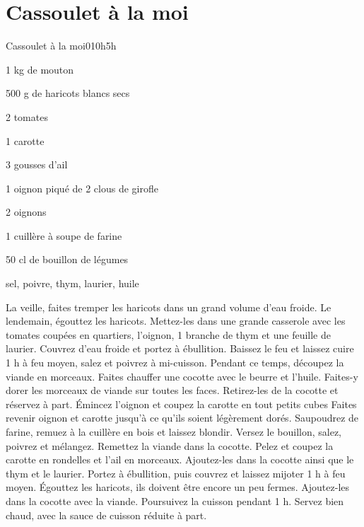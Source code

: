 {\section{Cassoulet à la moi}
\begin{recette}{Cassoulet à la moi}{0}{10h}{5h}
\begin{ingredients}[7 pers.]
\item 1 kg de mouton
\item 500 g de haricots blancs secs
\item 2 tomates
\item 1 carotte
\item 3 gousses d'ail
\item 1 oignon piqué de 2 clous de girofle
\item 2 oignons
\item 1 cuillère à soupe de farine
\item 50 cl de bouillon de légumes
\item sel, poivre, thym, laurier, huile
\end{ingredients}

\begin{preparation}
\etape La veille, faites tremper les haricots dans un grand volume d'eau froide.
\etape Le lendemain, égouttez les haricots. Mettez-les dans une grande casserole avec les tomates coupées en quartiers, 
l'oignon, 1 branche de thym et une feuille de laurier. Couvrez d'eau froide et portez à ébullition.
\etape Baissez le feu et laissez cuire 1 h à feu moyen, salez et poivrez à mi-cuisson.
\etape Pendant ce temps, découpez la viande en morceaux. Faites chauffer une cocotte avec le beurre et l'huile. Faites-y dorer 
les morceaux de viande sur toutes les faces.
\etape Retirez-les de la cocotte et réservez à part.
\etape Émincez l'oignon et coupez la carotte en tout petits cubes
\etape Faites revenir oignon et carotte jusqu'à ce qu'ils soient légèrement dorés. 
\etape Saupoudrez de farine, remuez à la cuillère en bois et laissez blondir.
\etape Versez le bouillon, salez, poivrez et mélangez. Remettez la viande dans la cocotte.
\etape Pelez et coupez la carotte en rondelles et l'ail en morceaux. Ajoutez-les dans la cocotte ainsi que le thym et le 
laurier. Portez à ébullition, puis couvrez et laissez mijoter 1 h à feu moyen.
\etape Égouttez les haricots, ils doivent être encore un peu fermes. Ajoutez-les dans la cocotte avec la viande.
\etape Poursuivez la cuisson pendant 1 h.
\etape Servez bien chaud, avec la sauce de cuisson réduite à part.
\end{preparation}
\end{recette}


}
